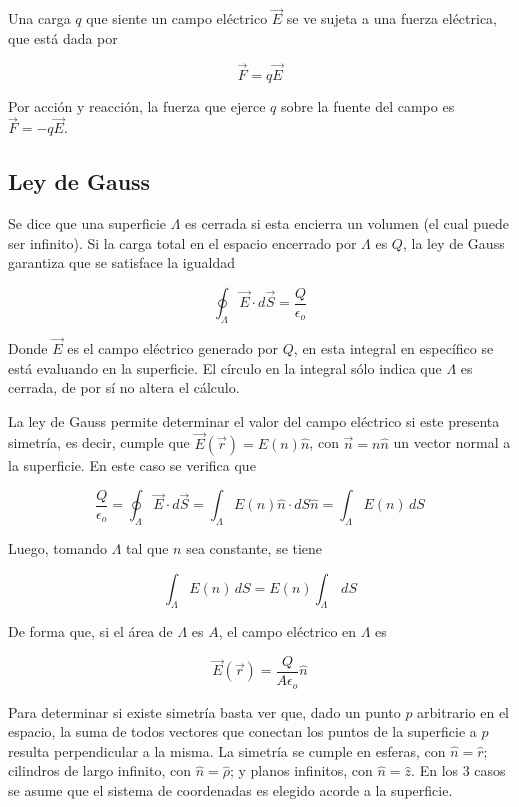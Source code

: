 Una carga $q$ que siente un campo eléctrico $\Vec{E}$ se ve sujeta a una fuerza eléctrica, que está dada por

\[\Vec{F} = q\Vec{E}\]

Por acción y reacción, la fuerza que ejerce $q$ sobre la fuente del campo es $\Vec{F} = -q\Vec{E}$.

\subsection{Ley de Gauss}

Se dice que una superficie $\Lambda$ es cerrada si esta encierra un volumen (el cual puede ser infinito). Si la carga total en el espacio encerrado por $\Lambda$ es $Q$, la ley de Gauss garantiza que se satisface la igualdad

\[\oint_{\Lambda} \Vec{E}\cdot d\Vec{S} = \frac{Q}{\epsilon_o}\]

Donde $\Vec{E}$ es el campo eléctrico generado por $Q$, en esta integral en específico se está evaluando en la superficie. El círculo en la integral sólo indica que $\Lambda$ es cerrada, de por sí no altera el cálculo.

La ley de Gauss permite determinar el valor del campo eléctrico si este presenta simetría, es decir, cumple que $\Vec{E}(\Vec{r}) = E(n)\hat{n}$, con $\Vec{n} = n\hat{n}$ un vector normal a la superficie. En este caso se verifica que

\[\frac{Q}{\epsilon_o} = \oint_{\Lambda} \Vec{E}\cdot d\Vec{S} = \int_{\Lambda} E(n)\hat{n}\cdot dS\hat{n} = \int_{\Lambda} E(n) \,dS\]

Luego, tomando $\Lambda$ tal que $n$ sea constante, se tiene

\[\int_{\Lambda} E(n)\,dS = E(n)\int_{\Lambda}\,dS\]

De forma que, si el área de $\Lambda$ es $A$, el campo eléctrico en $\Lambda$ es

\[\Vec{E}(\Vec{r}) = \frac{Q}{A\epsilon_o}\hat{n}\]

Para determinar si existe simetría basta ver que, dado un punto $p$ arbitrario en el espacio, la suma de todos vectores que conectan los puntos de la superficie a $p$ resulta perpendicular a la misma.
\bigbreak
La simetría se cumple en esferas, con $\hat{n}=\hat{r}$; cilindros de largo infinito, con $\hat{n}=\hat{\rho}$; y planos infinitos, con $\hat{n}=\hat{z}$. En los 3 casos se asume que el sistema de coordenadas es elegido acorde a la superficie.



\newpage